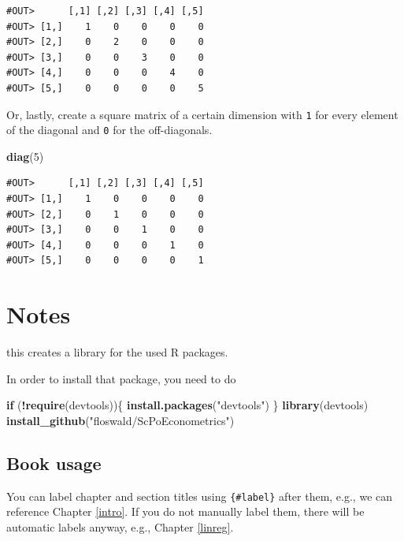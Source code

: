 \documentclass[]{book}
\newenvironment{Shaded}{\begin{snugshade}}{\end{snugshade}}
\newcommand{\KeywordTok}[1]{\textcolor[rgb]{0.13,0.29,0.53}{\textbf{#1}}}
\newcommand{\DecValTok}[1]{\textcolor[rgb]{0.00,0.00,0.81}{#1}}
\newcommand{\StringTok}[1]{\textcolor[rgb]{0.31,0.60,0.02}{#1}}
\newcommand{\ControlFlowTok}[1]{\textcolor[rgb]{0.13,0.29,0.53}{\textbf{#1}}}
\newcommand{\OperatorTok}[1]{\textcolor[rgb]{0.81,0.36,0.00}{\textbf{#1}}}
\newcommand{\NormalTok}[1]{#1}
\theoremstyle{definition}
\theoremstyle{definition}
\theoremstyle{definition}
\theoremstyle{remark}
\begin{document}
\begin{verbatim}
#OUT>      [,1] [,2] [,3] [,4] [,5]
#OUT> [1,]    1    0    0    0    0
#OUT> [2,]    0    2    0    0    0
#OUT> [3,]    0    0    3    0    0
#OUT> [4,]    0    0    0    4    0
#OUT> [5,]    0    0    0    0    5
\end{verbatim}

Or, lastly, create a square matrix of a certain dimension with
\texttt{1} for every element of the diagonal and \texttt{0} for the
off-diagonals.

\begin{Shaded}
\begin{Highlighting}[]
\KeywordTok{diag}\NormalTok{(}\DecValTok{5}\NormalTok{)}
\end{Highlighting}
\end{Shaded}

\begin{verbatim}
#OUT>      [,1] [,2] [,3] [,4] [,5]
#OUT> [1,]    1    0    0    0    0
#OUT> [2,]    0    1    0    0    0
#OUT> [3,]    0    0    1    0    0
#OUT> [4,]    0    0    0    1    0
#OUT> [5,]    0    0    0    0    1
\end{verbatim}

\chapter{Notes}\label{notes}

this creates a library for the used R packages.

In order to install that package, you need to do

\begin{Shaded}
\begin{Highlighting}[]
\ControlFlowTok{if}\NormalTok{ (}\OperatorTok{!}\KeywordTok{require}\NormalTok{(devtools))\{}
  \KeywordTok{install.packages}\NormalTok{(}\StringTok{"devtools"}\NormalTok{)}
\NormalTok{\}}
\KeywordTok{library}\NormalTok{(devtools)}
\KeywordTok{install_github}\NormalTok{(}\StringTok{"floswald/ScPoEconometrics"}\NormalTok{)  }
\end{Highlighting}
\end{Shaded}

\section{Book usage}\label{book-usage}

You can label chapter and section titles using \texttt{\{\#label\}}
after them, e.g., we can reference Chapter \ref{intro}. If you do not
manually label them, there will be automatic labels anyway, e.g.,
Chapter \ref{linreg}.
\end{document}
